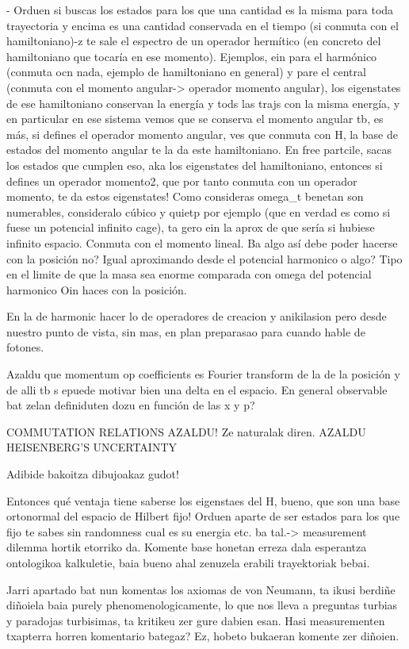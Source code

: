 \documentclass[11pt, a4paper]{article} %
\begin{document}
- Orduen si buscas los estados para los que una cantidad es la misma para toda trayectoria y encima es una cantidad conservada en el tiempo (si conmuta con el hamiltoniano)-z te sale el espectro de un operador hermítico (en concreto del hamiltoniano que tocaría en ese momento). Ejemplos, ein para el harmónico (conmuta ocn nada, ejemplo de hamiltoniano en general) y pare el central (conmuta con el momento angular-> operador momento angular), los eigenstates de ese hamiltoniano conservan la energía y tods las trajs con la misma energía, y en particular en ese sistema vemos que se conserva el momento angular tb, es más, si defines el operador momento angular, ves que conmuta con H, la base de estados del momento angular te la da este hamiltoniano. En free partcile, sacas los estados que cumplen eso, aka los eigenstates del hamiltoniano, entonces si defines un operador momento2, que por tanto conmuta con un operador momento, te da estos eigenstates! Como consideras omega\_t benetan son numerables, consideralo cúbico y quietp por ejemplo (que en verdad es como si fuese un potencial infinito cage), ta gero ein la aprox de que sería si hubiese infinito espacio. Conmuta con el momento lineal. Ba algo así debe poder hacerse con la posición no? Igual aproximando desde el potencial harmonico o algo? Tipo en el limite de que la masa sea enorme comparada con omega del potencial harmonico  Oin haces con la posición.

En la de harmonic hacer lo de operadores de creacion y anikilasion pero desde nuestro punto de vista, sin mas, en plan preparasao para cuando hable de fotones.

Azaldu que momentum op coefficients es Fourier transform de la de la posición y de alli tb s epuede motivar bien una delta en el espacio.
En general observable bat zelan definiduten dozu en función de las x y p?

COMMUTATION RELATIONS AZALDU! Ze naturalak diren.
AZALDU HEISENBERG'S UNCERTAINTY

Adibide bakoitza dibujoakaz gudot!

Entonces qué ventaja tiene saberse los eigenstaes del H, bueno, que son una base ortonormal del espacio de Hilbert fijo! Orduen aparte de ser estados para los que fijo te sabes sin randomness cual es su energia etc. ba tal.-> measurement dilemma hortik etorriko da. Komente base honetan erreza dala esperantza ontologikoa kalkuletie, baia bueno ahal zenuzela erabili trayektoriak bebai.

Jarri apartado bat nun komentas los axiomas de von Neumann, ta ikusi berdiñe diñoiela baia purely phenomenologicamente, lo que nos lleva a preguntas turbias y paradojas turbisimas, ta kritikeu zer gure dabien esan. Hasi measurementen txapterra horren komentario bategaz? Ez, hobeto bukaeran komente zer diñoien.
\end{document}
